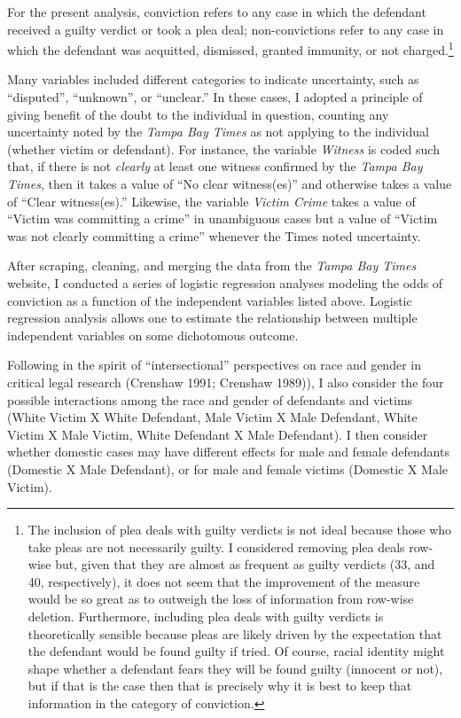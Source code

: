 \documentclass[12pt,article]{article}
\begin{document}
For the present analysis, conviction refers to any case in which the
defendant received a guilty verdict or took a plea deal; non-convictions
refer to any case in which the defendant was acquitted, dismissed,
granted immunity, or not charged.\footnote{The inclusion of plea deals
  with guilty verdicts is not ideal because those who take pleas are not
  necessarily guilty. I considered removing plea deals row-wise but,
  given that they are almost as frequent as guilty verdicts (33, and 40,
  respectively), it does not seem that the improvement of the measure
  would be so great as to outweigh the loss of information from row-wise
  deletion. Furthermore, including plea deals with guilty verdicts is
  theoretically sensible because pleas are likely driven by the
  expectation that the defendant would be found guilty if tried. Of
  course, racial identity might shape whether a defendant fears they
  will be found guilty (innocent or not), but if that is the case then
  that is precisely why it is best to keep that information in the
  category of conviction.}

Many variables included different categories to indicate uncertainty,
such as ``disputed'', ``unknown'', or ``unclear.'' In these cases, I
adopted a principle of giving benefit of the doubt to the individual in
question, counting any uncertainty noted by the \emph{Tampa Bay Times}
as not applying to the individual (whether victim or defendant). For
instance, the variable \emph{Witness} is coded such that, if there is
not \emph{clearly} at least one witness confirmed by the \emph{Tampa Bay
Times}, then it takes a value of ``No clear witness(es)'' and otherwise
takes a value of ``Clear witness(es).'' Likewise, the variable
\emph{Victim Crime} takes a value of ``Victim was committing a crime''
in unambiguous cases but a value of ``Victim was not clearly committing
a crime'' whenever the Times noted uncertainty.

After scraping, cleaning, and merging the data from the \emph{Tampa Bay
Times} website, I conducted a series of logistic regression analyses
modeling the odds of conviction as a function of the independent
variables listed above. Logistic regression analysis allows one to
estimate the relationship between multiple independent variables on some
dichotomous outcome.

Following in the spirit of ``intersectional'' perspectives on race and
gender in critical legal research (Crenshaw 1991; Crenshaw 1989)), I
also consider the four possible interactions among the race and gender
of defendants and victims (White Victim X White Defendant, Male Victim X
Male Defendant, White Victim X Male Victim, White Defendant X Male
Defendant). I then consider whether domestic cases may have different
effects for male and female defendants (Domestic X Male Defendant), or
for male and female victims (Domestic X Male Victim).
\end{document}
